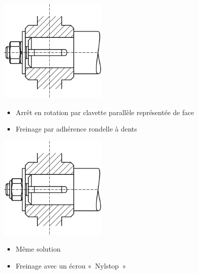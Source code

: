 \documentclass[11pt,oneside]{article}
\begin{document}
\noindent\begin{minipage}[c]{.45\linewidth}

 
\end{minipage} \hfill
\noindent\begin{minipage}[c]{.45\linewidth}
 
\end{minipage} 

\noindent\begin{minipage}[c]{.45\linewidth}
 \begin{center}
  \includegraphics[height=5cm]{png/Fig5}


 \end{center}



\begin{itemize}
\item Arrêt en rotation par clavette parallèle représentée de face
\item Freinage par adhérence rondelle à dents
\end{itemize}
 
\end{minipage} \hfill
\noindent\begin{minipage}[c]{.45\linewidth}
 \begin{center}
  \includegraphics[height=5cm]{png/Fig6}


 \end{center}


\begin{itemize}
\item Même solution
\item Freinage avec un écrou «~Nylstop~»
\end{itemize}
 
\end{minipage} 
\end{document}
